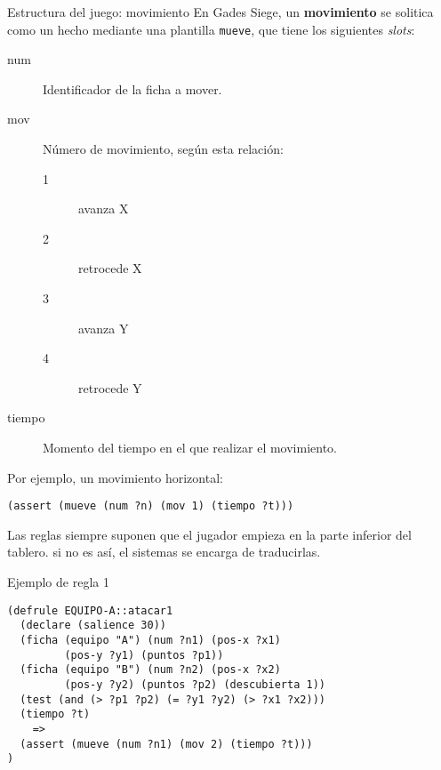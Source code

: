\documentclass[smaller,spanish,xcolor=svgnames]{beamer}
\begin{document}
\begin{frame}[fragile]{Estructura del juego: movimiento}
  En Gades Siege, un \textbf{movimiento} se solitica como un hecho mediante
  una plantilla \texttt{mueve}, que tiene los siguientes \textit{slots}:

  \begin{description}
  \item[num] Identificador de la ficha a mover.
  \item[mov] Número de movimiento, según esta relación:
    {\small
    \begin{description}
    \item[1] avanza X
    \item[2] retrocede X
    \item[3] avanza Y
    \item[4] retrocede Y
    \end{description}}
  \item[tiempo] Momento del tiempo en el que realizar el movimiento.
  \end{description}

Por ejemplo, un movimiento horizontal:
\begin{verbatim}
(assert (mueve (num ?n) (mov 1) (tiempo ?t)))
\end{verbatim}

Las reglas siempre suponen que el jugador empieza en la parte inferior del tablero. si no es así, el sistemas se encarga de traducirlas.
\end{frame}

\begin{frame}[fragile]{Ejemplo de regla 1}
\begin{verbatim}
(defrule EQUIPO-A::atacar1
  (declare (salience 30))
  (ficha (equipo "A") (num ?n1) (pos-x ?x1)
         (pos-y ?y1) (puntos ?p1))
  (ficha (equipo "B") (num ?n2) (pos-x ?x2)
         (pos-y ?y2) (puntos ?p2) (descubierta 1))
  (test (and (> ?p1 ?p2) (= ?y1 ?y2) (> ?x1 ?x2)))
  (tiempo ?t)
    =>
  (assert (mueve (num ?n1) (mov 2) (tiempo ?t)))
)
\end{verbatim}
\end{frame}
\end{document}
